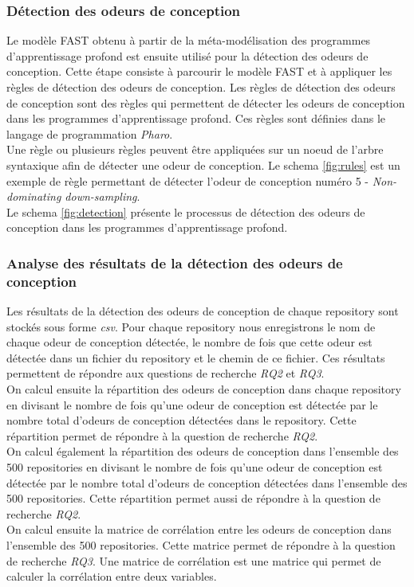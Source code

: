 \subsubsection{Détection des odeurs de conception}
\label{sec:Détection des odeurs de conception}
Le modèle FAST obtenu à partir de la méta-modélisation des programmes
d'apprentissage profond est ensuite utilisé pour la détection des odeurs de
conception. Cette étape consiste à parcourir le modèle FAST et à appliquer les
règles de détection des odeurs de conception. Les règles de détection des odeurs
de conception sont des règles qui permettent de détecter les odeurs de
conception dans les programmes d'apprentissage profond. Ces règles sont définies
dans le langage de programmation \emph{Pharo}.\\ Une règle ou plusieurs règles
peuvent être appliquées sur un noeud de l'arbre syntaxique afin de détecter une
odeur de conception. Le schema \ref{fig:rules} est un exemple de règle
permettant de détecter l'odeur de conception numéro 5 - \emph{Non-dominating down-sampling}.\\
Le schema \ref{fig:detection} présente le processus de détection des odeurs de conception dans les programmes d'apprentissage profond.\\


\subsubsection{Analyse des résultats de la détection des odeurs de conception}
\label{sec:Analyse des résultats de la détection des odeurs de conception}
Les résultats de la détection des odeurs de conception de chaque repository sont
stockés sous forme \emph{csv}. Pour chaque repository nous enregistrons le nom de
chaque odeur de conception détectée, le nombre de fois que cette odeur est
détectée dans un fichier du repository et le chemin de ce fichier. Ces résultats
permettent de répondre aux questions de recherche \emph{RQ2} et \emph{RQ3}.\\
On calcul ensuite la répartition des odeurs de conception dans chaque repository
en divisant le nombre de fois qu'une odeur de conception est détectée par le
nombre total d'odeurs de conception détectées dans le repository. Cette
répartition permet de répondre à la question de recherche \emph{RQ2}.\\ On
calcul également la répartition des odeurs de conception dans l'ensemble des 500
repositories en divisant le nombre de fois qu'une odeur de conception est
détectée par le nombre total d'odeurs de conception détectées dans l'ensemble
des 500 repositories. Cette répartition permet aussi de répondre à la
question de recherche \emph{RQ2}.\\
On calcul ensuite la matrice de corrélation entre les odeurs de conception dans
l'ensemble des 500 repositories. Cette matrice permet de répondre à la question
de recherche \emph{RQ3}. Une matrice de corrélation est une matrice qui permet
de calculer la corrélation entre deux variables.

